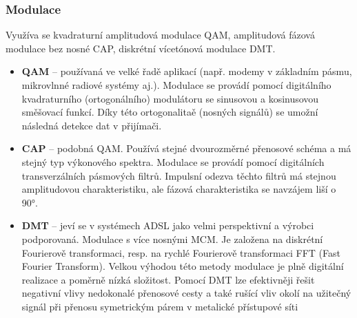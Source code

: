 \subsubsection{Modulace}
Využíva se kvadraturní amplitudová modulace QAM, amplitudová fázová modulace bez nosné CAP, diskrétní vícetónová modulace DMT.
\begin{itemize}
    \item \textbf{QAM} -- používaná ve velké řadě aplikací (např. modemy v základním pásmu, mikrovlnné radiové systémy aj.). Modulace se provádí pomocí digitálního kvadraturního (ortogonálního) modulátoru se sinusovou a kosinusovou směšovací funkcí. Díky této ortogonalitaě (nosných signálů) se umožní následná detekce dat v přijímači.
    \item \textbf{CAP} -- podobná QAM. Používá stejné dvourozměrné přenosové schéma a má stejný typ výkonového spektra. Modulace se provádí pomocí digitálních transverzálních pásmových filtrů. Impulsní odezva těchto filtrů má stejnou amplitudovou charakteristiku, ale fázová charakteristika se navzájem liší o 90°.
    \item \textbf{DMT} -- jeví se v systémech ADSL jako velmi perspektivní a výrobci podporovaná. Modulace s více nosnými MCM. Je založena na diskrétní Fourierově transformaci, resp. na rychlé Fourierově transformaci FFT (Fast Fourier Transform). Velkou výhodou této metody modulace je plně digitální realizace a poměrně nízká složitost. Pomocí DMT lze efektivněji řešit negativní vlivy nedokonalé přenosové cesty a také rušící vliv okolí na užitečný signál při přenosu symetrickým párem v metalické přístupové síti
\end{itemize}
\newpage

